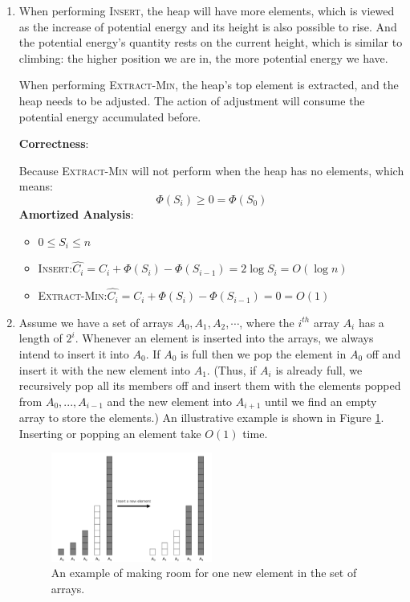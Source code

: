 \documentclass[12pt,a4paper]{article}
\makeatletter
\newtheorem*{solution}{Solution}
\theoremstyle{definition}
\renewenvironment{solution}[1][Solution] {\par\pushQED{\qed}\normalfont\topsep6\p@\@plus6\p@\relax\trivlist\item[\hskip\labelsep\bfseries#1\@addpunct{.}]\ignorespaces}{\popQED\endtrivlist\@endpefalse} \makeatother
\makeatother
\begin{document}
\begin{enumerate}
\begin{solution}
When performing \textsc{Insert}, the heap will have more elements, which is viewed as the increase of potential energy and its height is also possible to rise. And the potential energy's quantity rests on the current height, which is similar to climbing: the higher position we are in, the more potential energy we have.

When performing \textsc{Extract-Min}, the heap's top element is extracted, and the heap needs to be adjusted. The action of adjustment will consume the potential energy accumulated before.

\textbf{Correctness}: 

Because \textsc{Extract-Min} will not perform when the heap has no elements, which means:
$$\Phi(S_i) \geq 0 = \Phi(S_0)$$
\textbf{Amortized Analysis}:
\begin{itemize}
\item $0 \leq S_i \leq n $
    \item \textsc{Insert}:\quad $
\hat{C_i} = C_i + \Phi(S_i) - \Phi(S_{i-1}) = 2\log S_i = O(\log n)
$
\item \textsc{Extract-Min}:\quad $
\hat{C_i} = C_i + \Phi(S_i)-\Phi(S_{i-1}) = 0 = O(1)
$
\end{itemize}

\end{solution}
	
	\item Assume we have a set of arrays $A_0, A_1, A_2,\cdots$, where the $i^{th}$ array $A_i$ has a length of $2^i$. Whenever an element is inserted into the arrays, we always intend to insert it into $A_0$. If $A_0$ is full then we pop the element in $A_0$ off and insert it with the new element into $A_{1}$. (Thus, if $A_{i}$ is already full, we recursively pop all its members off and insert them with the elements popped from $A_0,...,A_{i-1}$ and the new element into $A_{i+1}$ until we find an empty array to store the elements.) An illustrative example is shown in Figure \ref{Fig-MultiArray}. Inserting or popping an element take $O(1)$ time.

	\begin{figure}[!htbp]
	\centering
	\includegraphics[width=0.5\textwidth]{Fig-MultiArray.pdf}
	\caption{An example of making room for one new element in the set of arrays.}
	\label{Fig-MultiArray}
	\end{figure}


\end{enumerate}
\end{document}
